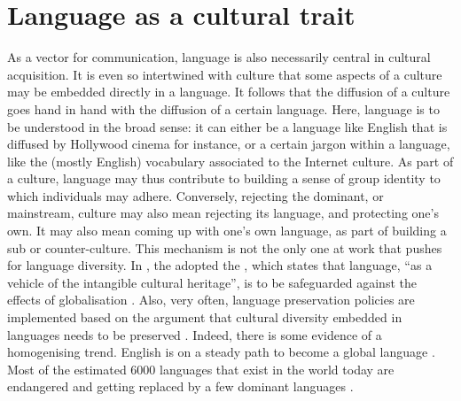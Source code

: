 \documentclass[../thesis.tex]{subfiles}
\begin{document}


\section{Language as a cultural trait}
As a vector for communication, language is also necessarily central in cultural
acquisition. It is even so intertwined with culture that some aspects of a culture may
be embedded directly in a language. It follows that the diffusion of a culture goes hand
in hand with the diffusion of a certain language. Here, language is to be understood in
the broad sense: it can either be a language like English that is diffused by Hollywood
cinema for instance, or a certain jargon within a language, like the (mostly English)
vocabulary associated to the Internet culture. As part of a culture, language may thus
contribute to building a sense of group identity to which individuals may adhere.
Conversely, rejecting the dominant, or mainstream, culture may also mean rejecting its
language, and protecting one's own. It may also mean coming up with one's own language,
as part of building a sub or counter-culture. This mechanism is not the only one at work
that pushes for language diversity. In \citeyear{UNESCOConventionSafeguarding2003}, the
\citeauthor{UNESCOConventionSafeguarding2003} adopted the
, which states that language, ``as a vehicle
of the intangible cultural heritage'', is to be safeguarded against the effects of
globalisation \cite{UNESCOConventionSafeguarding2003}. Also, very often, language
preservation policies are implemented based on the argument that cultural diversity
embedded in languages needs to be preserved
\cite{CrystalLanguageDeath2000,GrenobleEndangeredLanguages1998,KraussWorldLanguages1992}.
Indeed, there is some evidence of a homogenising trend. English is on a steady path to
become a global language \cite{CrystalEnglishGlobal2010}. Most of the estimated
\SI{6000}{} languages that exist in the world today are endangered
\cite{CrystalLanguageDeath2000,GrenobleEndangeredLanguages1998,KraussWorldLanguages1992}
and getting replaced by a few dominant languages
\cite{GrilloDominantLanguages1989,WardhaughLanguagesCompetition1987}.
\end{document}
